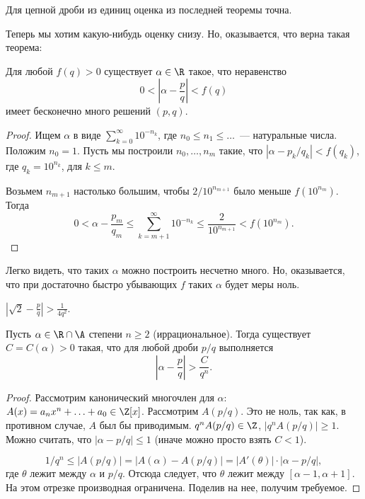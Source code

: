 \begin{stm}
  Для цепной дроби из единиц оценка из последней теоремы точна.
\end{stm}

Теперь мы хотим какую-нибудь оценку снизу. Но, оказывается, что верна такая теорема:
\begin{theorem}
  Для любой $f(q) > 0$ существует $\alpha \in \R$ такое, что неравенство
  $$
    0 < \left| \alpha - \frac{p}{q} \right| < f(q)
  $$
  имеет бесконечно много решений $(p, q)$.
\end{theorem}
\begin{proof}
  Ищем $\alpha$ в виде $\displaystyle\sum_{k=0}^{\infty} 10^{-n_k}$, где $n_0 \leqslant n_1 \leqslant \ldots$~— 
  натуральные числа. Положим $n_0 = 1$. Пусть мы построили $n_0, \ldots, n_m$ такие, что
  $|\alpha - p_k / q_k| < f(q_k)$, где $q_k = 10^{n_k}$, для $k \leqslant m$.

  Возьмем $n_{m+1}$ настолько большим, чтобы $2 / 10^{n_{m+1}}$ было меньше $f(10^{n_m})$. Тогда
  $$
    0 < \alpha - \frac{p_m}{q_m} \leqslant \sum_{k=m+1}^{\infty} 10^{-n_k} \leqslant \frac{2}{10^{n_{m+1}}} < f(10^{n_m}).
  $$
\end{proof}

Легко видеть, что таких $\alpha$ можно построить несчетно много. Но, оказывается, что при достаточно быстро убывающих $f$ таких $\alpha$ будет меры ноль.

\begin{stm}
  $\left| \sqrt{2} - \frac{p}{q} \right| > \frac{1}{4q^2}$.
\end{stm}

\begin{theorem}[Лиувилля]
  Пусть $\alpha \in \R \cap \A$ степени $n \geqslant 2$ (иррациональное). Тогда существует $C = C(\alpha) > 0$ такая, что для любой дроби $p/q$ выполняется
  $$
    \left| \alpha - \frac{p}{q} \right| > \frac{C}{q^n}.
  $$
\end{theorem}
\begin{proof}
  Рассмотрим канонический многочлен для $\alpha$: $A(x) = a_n x^n + \ldots + a_0 \in \Z[x]$. Рассмотрим $A(p/q)$. 
  Это не ноль, так как, в противном случае, $A$ был бы приводимым. $q^n A(p/q) \in \Z$, $|q^n A(p/q)| \geqslant 1$. 
  Можно считать, что $|\alpha - p / q| \leqslant 1$ (иначе можно просто взять  $C < 1$).

  $$
    1 / q^n \leqslant |A(p / q)| = |A(\alpha) - A(p / q)| = |A'(\theta)| \cdot |\alpha - p / q|,
  $$
  где $\theta$ лежит между $\alpha$ и $p / q$. Отсюда следует, что $\theta$ лежит между $[\alpha - 1, \alpha + 1]$. На этом отрезке производная ограничена. Поделив на нее, получим требуемое.
\end{proof}

